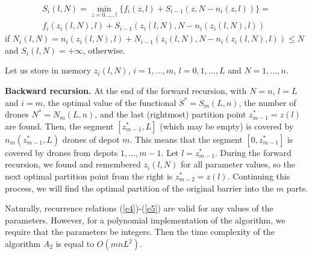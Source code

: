 \documentclass[runningheads]{llncs}
\begin{document}
\begin{equation}\label{e5}
 \begin{array}{ll}
    S_i(l,N)=\min\limits_{z=0,\ldots,l}\{f_i(z,l)+S_{i-1}(z,N-n_i(z,l))\}= \\
    f_i(z_i(l,N),l)+S_{i-1}(z_i(l,N),N-n_i(z_i(l,N),l))
  \end{array}
\end{equation}
if $N_i(l,N)=n_i(z_i(l,N),l)+N_{i-1}(z_i(l,N),N-n_i(z_i(l,N),l))\leq N$ and $S_i(l,N)=+\infty$, otherwise.

Let us store in memory $z_i(l,N)$, $i=1,\ldots,m$, $l=0,1,\ldots,L$ and $N=1,\ldots,n$.

\textbf{Backward recursion.}
At the end of the forward recursion, with $N=n$, $l=L$ and $i=m$, the optimal value of the functional $S^*=S_m(L,n)$, the number of drones $N^*=N_m(L,n)$, and the last (rightmost) partition point $z_{m-1}^*=z(l)$ are found. Then, the segment $[z_{m-1}^*,L]$ (which may be empty) is covered by $n_m(z_{m-1}^*,L)$ drones of depot $m$. This means that the segment $[0,z_{m-1}^*]$ is covered by drones from depots $1,\ldots,m-1$. Let $l=z_{m-1}^*$. During the forward recursion, we found and remembered $z_i(l,N)$ for all parameter values, so the next optimal partition point from the right is $z_{m-2}^*=z(l)$. Continuing this process, we will find the optimal partition of the original barrier into the $m$ parts.

Naturally, recurrence relations (\ref{e4})-(\ref{e5}) are valid for any values of the parameters. However, for a polynomial implementation of the algorithm, we require that the parameters be integers. Then the time complexity of the algorithm $A_2$ is equal to $O(mnL^2)$.
\end{document}
